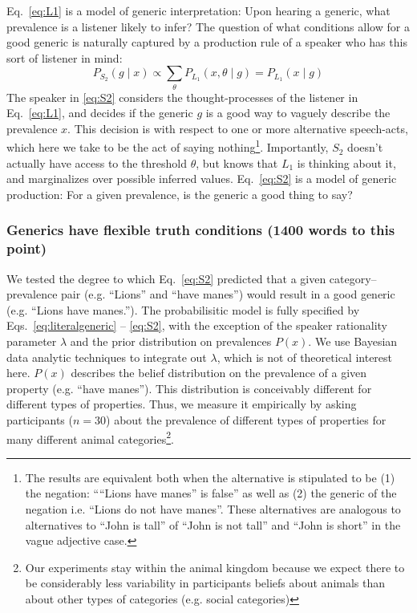 \documentclass[10pt,letterpaper]{article}
\begin{document}
Eq.~\ref{eq:L1} is a model of generic interpretation: Upon hearing a generic, what prevalence is a listener likely to infer?
The question of what conditions allow for a good generic is naturally captured by a production rule of a speaker who has this sort of listener in mind:
\begin{equation} 
P_{S_{2}}(g \mid x) \propto  \sum_{\theta} P_{L_{1}}(x , \theta \mid g) =  P_{L_{1}}(x \mid g)
\label{eq:S2}
\end{equation}
%
The speaker in \eqref{eq:S2} considers the thought-processes of the listener in Eq.~\eqref{eq:L1}, and decides if the generic $g$ is a good way to vaguely describe the prevalence $x$. 
This decision is with respect to one or more alternative speech-acts, which here we take to be the act of saying nothing\footnote{The results are equivalent both when the alternative is stipulated to be (1) the negation:  ````Lions have manes'' is false'' as well as (2) the generic of the negation i.e. ``Lions do not have manes''. These alternatives are analogous to alternatives to ``John is tall'' of ``John is not tall'' and ``John is short'' in the vague adjective case.}. 
Importantly, $S_{2}$ doesn't actually have access to the threshold $\theta$, but knows that $L_{1}$ is thinking about it, and marginalizes over possible inferred values. 
Eq.~\eqref{eq:S2} is a model of generic production: For a given prevalence, is the generic a good thing to say?

\subsubsection{Generics have flexible truth conditions (1400 words to this point)} 

We tested the degree to which Eq.~\eqref{eq:S2} predicted that a given category--prevalence pair (e.g. ``Lions'' and ``have manes'') would result in a good generic (e.g. ``Lions have manes.''). 
 The probabilisitic model is fully specified by Eqs.~\eqref{eq:literalgeneric} -- \eqref{eq:S2}, with the exception of the speaker rationality parameter $\lambda$ and the prior distribution on prevalences $P(x)$. 
 We use Bayesian data analytic techniques to integrate out $\lambda$, which is not of theoretical interest here. 
 $P(x)$ describes the belief distribution on the prevalence of a given property (e.g. ``have manes''). 
 This distribution is conceivably different for different types of properties. 
 Thus, we measure it empirically by asking participants ($n=30$) about the prevalence of different types of properties for many different animal categories\footnote{Our experiments stay within the animal kingdom because we expect there to be considerably less variability in participants beliefs about animals than about other types of categories (e.g. social categories)}. 
 
\end{document}
